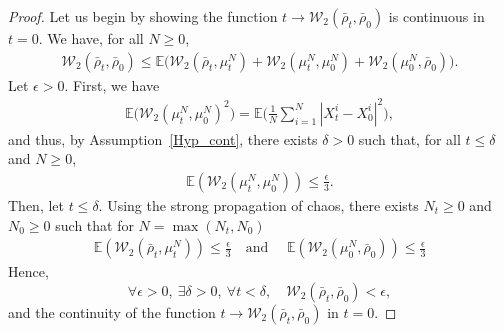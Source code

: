 \begin{proof}
Let us begin by showing the function $t\to\mathcal{W}_2\left(\bar{\rho}_{t},\bar{\rho}_{0}\right)$ is continuous in $t=0$. We have, for all $N\geq0$,
\begin{align*}
\mathcal{W}_2\left(\bar{\rho}_{t},\bar{\rho}_{0}\right)\leq\mathbb{E}\bigl(\mathcal{W}_2\left(\bar{\rho}_t,\mu^N_t\right)+\mathcal{W}_2\left(\mu^N_t,\mu^N_0\right)+\mathcal{W}_2\left(\mu^N_0,\bar{\rho}_{0}\right)\bigr).
\end{align*}
Let $\epsilon>0$.
First, we have
\begin{align*}
\mathbb{E}\bigl(\mathcal{W}_2\left(\mu^N_t,\mu^N_0\right)^2\bigr)=\mathbb{E}\biggl(\frac{1}{N}\sum_{i=1}^N|X^i_t-X^i_0|^2\biggr),
\end{align*}
and thus, by Assumption~\ref{Hyp_cont}, there exists $\delta>0$ such that, for all $t\leq \delta$ and $N\geq0$,
\begin{align*}
\mathbb{E}\left(\mathcal{W}_2\left(\mu^N_t,\mu^N_0\right)\right)\leq\frac{\epsilon}{3}.
\end{align*}
Then, let $t\leq\delta$. Using the strong propagation of chaos, there exists $N_t\geq0$ and $N_0\geq0$ such that for $N=\max(N_t,N_0)$
\begin{align*}
\mathbb{E}\left(\mathcal{W}_2\left(\bar{\rho}_t,\mu^{N}_t\right)\right)\leq\frac{\epsilon}{3}\quad\text{and }\quad\mathbb{E}\left(\mathcal{W}_2\left(\mu^{N}_0,\bar{\rho}_{0}\right)\right)\leq\frac{\epsilon}{3}
\end{align*}
Hence,
\[
\forall \epsilon>0,\ \exists\delta>0,\ \forall t<\delta,\quad \mathcal{W}_2\left(\bar{\rho}_{t},\bar{\rho}_{0}\right)<\epsilon,
\]
and the continuity of the function $t\to\mathcal{W}_2\left(\bar{\rho}_{t},\bar{\rho}_{0}\right)$ in $t=0$.


\end{proof}
